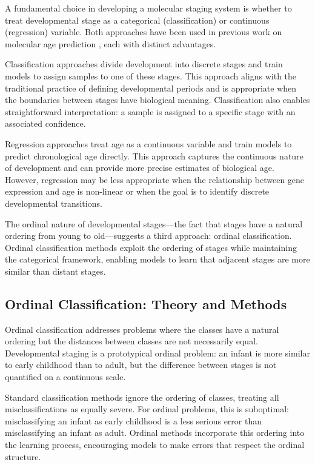 A fundamental choice in developing a molecular staging system is whether to treat developmental stage as a categorical (classification) or continuous (regression) variable. Both approaches have been used in previous work on molecular age prediction \parencite{horvath_dna_2013, frank_simple_2001}, each with distinct advantages.

Classification approaches divide development into discrete stages and train models to assign samples to one of these stages. This approach aligns with the traditional practice of defining developmental periods and is appropriate when the boundaries between stages have biological meaning. Classification also enables straightforward interpretation: a sample is assigned to a specific stage with an associated confidence.

Regression approaches treat age as a continuous variable and train models to predict chronological age directly. This approach captures the continuous nature of development and can provide more precise estimates of biological age. However, regression may be less appropriate when the relationship between gene expression and age is non-linear or when the goal is to identify discrete developmental transitions.

The ordinal nature of developmental stages---the fact that stages have a natural ordering from young to old---suggests a third approach: ordinal classification. Ordinal classification methods exploit the ordering of stages while maintaining the categorical framework, enabling models to learn that adjacent stages are more similar than distant stages.

\subsection{Ordinal Classification: Theory and Methods}

Ordinal classification addresses problems where the classes have a natural ordering but the distances between classes are not necessarily equal. Developmental staging is a prototypical ordinal problem: an infant is more similar to early childhood than to adult, but the difference between stages is not quantified on a continuous scale.

Standard classification methods ignore the ordering of classes, treating all misclassifications as equally severe. For ordinal problems, this is suboptimal: misclassifying an infant as early childhood is a less serious error than misclassifying an infant as adult. Ordinal methods incorporate this ordering into the learning process, encouraging models to make errors that respect the ordinal structure.

